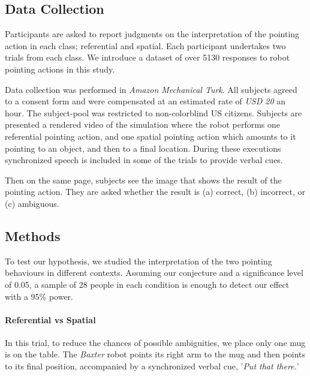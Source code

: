 \subsection{Data Collection}


Participants are asked to report judgments on the interpretation of the pointing action in each class; referential and spatial.  Each participant undertakes two trials from each class. We introduce a dataset of over 5130 responses to robot pointing actions in this study.

Data collection was performed in \textit{Amazon Mechanical Turk}.
All subjects agreed to a consent form and were compensated at an estimated rate of \textit{USD 20} an hour. The subject-pool was restricted to non-colorblind US citizens. Subjects are presented a rendered video of the simulation where the robot performs one referential pointing action, and one spatial pointing action which amounts to it pointing to an object, and then to a final location. During these executions synchronized speech is included in some of the trials to provide verbal cues.

Then on the same page, subjects see the image that shows the result of the pointing action. They are asked whether the result is (a) correct, (b) incorrect, or (c) ambiguous.  



\subsection{Methods}

To test our hypothesis, we studied the interpretation of the two pointing behaviours in different contexts. Assuming our conjecture and a significance level of 0.05, a sample of 28 people in each condition is enough to detect our effect with a 95\% power.

\paragraph{Referential vs Spatial}
In this trial, to reduce the chances of possible ambiguities, we place only one mug is on the table. The \textit{Baxter} robot points its right arm to the mug and then points to its final position, accompanied by a synchronized verbal cue, '\textit{Put that there.}'


